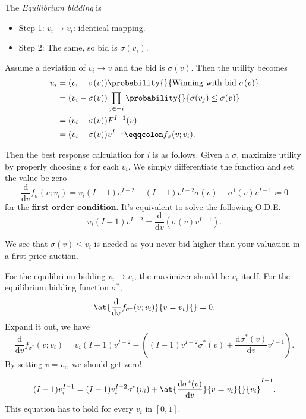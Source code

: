 \begin{remark}
	The \emph{Equilibrium bidding} is
	\begin{itemize}
		\item Step 1: \(v_{i}\to v_{i}\): identical mapping.
		\item Step 2: The same, so bid is \(\sigma(v_{i})\).
	\end{itemize}
\end{remark}

Assume a deviation of \(v_{i}\to v\) and the bid is \(\sigma(v)\). Then the utility becomes
\[
	\begin{split}
		u_{i} &= (v_{i} - \sigma(v))\probability{}{ \text{Winning with bid } \sigma(v)}\\
		&= (v_{i} - \sigma(v))\prod\limits_{j\in -i}\probability{}{\sigma(v_{j})\leq \sigma(v)}\\
		&= (v_{i} - \sigma(v))F^{I-1}(v)\\
		&= (v_{i} - \sigma(v))v^{I-1} \eqqcolon f_{\sigma}(v; v_{i}).
	\end{split}
\]

Then the best response calculation for \(i\) is as follows. Given a \(\sigma\), maximize utility by properly choosing \(v\) for each \(v_{i}\).
We simply differentiate the function and set the value be zero
\[
	\frac{\mathrm{d}}{\mathrm{d}v}f_{\sigma}(v;v_{i}) = v_{i}(I - 1)v^{I-2} - (I - 1)v^{I-2}\sigma(v) - \sigma^1(v)v^{I-1} \coloneqq 0
\]
for the \textbf{first order condition}. It's equivalent to solve the following O.D.E.
\[
	v_{i}(I - 1)v^{I-2} = \frac{\mathrm{d}}{\mathrm{d}v} (\sigma(v)v^{I-1}).
\]

We see that \(\sigma(v)\leq v_{i}\) is needed as you never bid higher than your valuation in a first-price auction.

\hr

For the equilibrium bidding \(v_{i}\to v_{i}\), the maximizer should be \(v_{i}\) itself. For the equilibrium bidding function \(\sigma^{\ast}\),
\[
	\at{\frac{\mathrm{d}}{\mathrm{d}v} f_{\sigma^{\ast}}(v;v_{i})}{v = v_{i}}{} = 0.
\]
Expand it out, we have
\[
	\frac{\mathrm{d}}{\mathrm{d}v} f_{\sigma^{\ast}}(v;v_{i}) = v_{i}(I - 1)v^{I-2} - \left((I - 1)v^{I-2}\sigma^{\ast}(v) + \frac{\mathrm{d}\sigma^{\ast}(v)}{\mathrm{d}v} v^{I-1}\right).
\]
By setting \(v = v_{i}\), we should get zero!

\[
	(I - 1)v_{i}^{I-1} = (I - 1)v_{i}^{I-2}\sigma^{\ast}(v_{i})+\at{\frac{\mathrm{d}\sigma^{\ast}(v)}{\mathrm{d}v}}{v = v_{i}}{}{v_{i}}^{I-1}.
\]
This equation has to hold for every \(v_{i}\) in \([0, 1]\).

